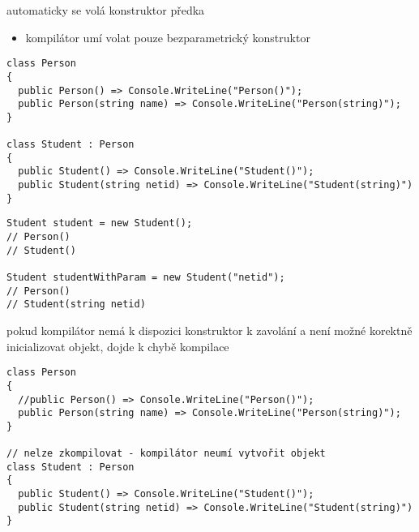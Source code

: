 \begin{frame}[fragile]
\vfill
\begin{bitemize}{}
\item automaticky se volá konstruktor předka
\begin{itemize}
\item kompilátor umí volat pouze bezparametrický konstruktor
\end{itemize}
\end{bitemize}
\vfill
\begin{yesblock}
\begin{lstlisting}[basicstyle=\small]
class Person
{
  public Person() => Console.WriteLine("Person()");
  public Person(string name) => Console.WriteLine("Person(string)");
}

class Student : Person
{
  public Student() => Console.WriteLine("Student()");
  public Student(string netid) => Console.WriteLine("Student(string)")
}
\end{lstlisting}
\end{yesblock}
\vfill
\end{frame}


\begin{frame}[fragile]
\begin{yesblock}
\begin{lstlisting}[basicstyle=\small]
Student student = new Student();
// Person()
// Student()

Student studentWithParam = new Student("netid");
// Person()
// Student(string netid)
\end{lstlisting}
\end{yesblock}
\end{frame}


\begin{frame}[fragile]
\vfill
\begin{bitemize}{}
\item pokud kompilátor nemá k dispozici konstruktor k zavolání a není možné korektně inicializovat objekt, dojde k chybě kompilace
\end{bitemize}
\vfill
\begin{noblock}
\begin{lstlisting}[basicstyle=\small]
class Person
{
  //public Person() => Console.WriteLine("Person()");
  public Person(string name) => Console.WriteLine("Person(string)");
}

// nelze zkompilovat - kompilátor neumí vytvořit objekt
class Student : Person
{
  public Student() => Console.WriteLine("Student()");
  public Student(string netid) => Console.WriteLine("Student(string)")
}
\end{lstlisting}
\end{noblock}
\vfill
\end{frame}



